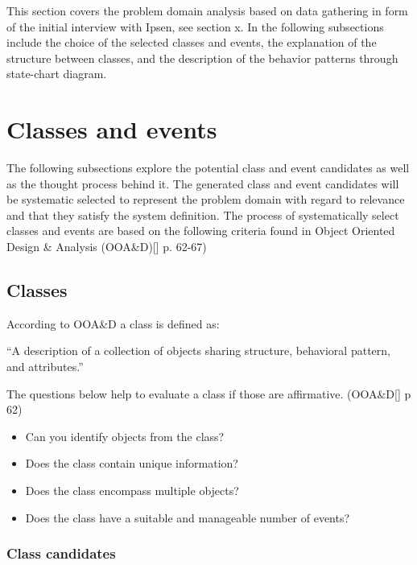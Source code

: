 This section covers the problem domain analysis based on data gathering in form of the initial interview with Ipsen, see section x. In the following subsections include the choice of the selected classes and events, the explanation of the structure between classes, and the description of the behavior patterns through state-chart diagram. 

\section{Classes and events}

The following subsections explore the potential class and event candidates as well as the thought process behind it. 
The generated class and event candidates will be systematic selected to represent the problem domain with regard to relevance and that they satisfy the system definition. 
The process of systematically select classes and events are based on the following criteria found in Object Oriented Design \& Analysis (OOA\&D)[] p. 62-67)

\subsection{Classes}
According to OOA\&D a class is defined as:

“A description of a collection of objects sharing structure, behavioral pattern, and attributes.”

The questions below help to evaluate a class if those are affirmative. (OOA\&D[] p 62)

\begin{itemize}
	\item Can you identify objects from the class?
	\item Does the class contain unique information?
	\item Does the class encompass multiple objects?
	\item Does the class have a suitable and manageable number of events?
\end{itemize}

\subsubsection{Class candidates}



